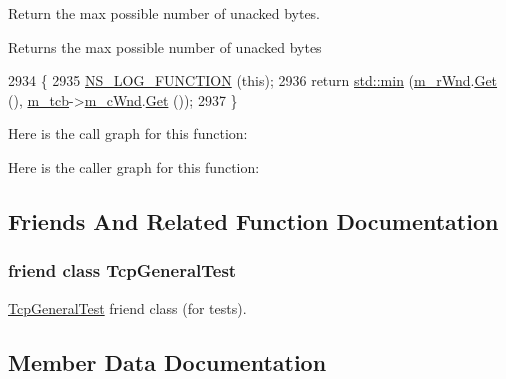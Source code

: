 Return the max possible number of unacked bytes. 

\begin{DoxyReturn}{Returns}
the max possible number of unacked bytes 
\end{DoxyReturn}

\begin{DoxyCode}
2934 \{
2935   \hyperlink{log-macros-disabled_8h_a90b90d5bad1f39cb1b64923ea94c0761}{NS\_LOG\_FUNCTION} (\textcolor{keyword}{this});
2936   \textcolor{keywordflow}{return} \hyperlink{80211b_8c_ac6afabdc09a49a433ee19d8a9486056d}{std::min} (\hyperlink{classns3_1_1TcpSocketBase_af3fafd1671964e0674677be541e1501a}{m\_rWnd}.\hyperlink{classns3_1_1TracedValue_a10fddd1de961ac65acfbeb440a1e8551}{Get} (), \hyperlink{classns3_1_1TcpSocketBase_a26bbaf59001308dc43fb630d76f2e38b}{m\_tcb}->\hyperlink{classns3_1_1TcpSocketState_a7cd3d2156a483c1db436097477a0fd7f}{m\_cWnd}.\hyperlink{classns3_1_1TracedValue_a10fddd1de961ac65acfbeb440a1e8551}{Get} ());
2937 \}
\end{DoxyCode}


Here is the call graph for this function\+:




Here is the caller graph for this function\+:




\subsection{Friends And Related Function Documentation}
\subsubsection[{\texorpdfstring{Tcp\+General\+Test}{TcpGeneralTest}}]{\setlength{\rightskip}{0pt plus 5cm}friend class {\bf Tcp\+General\+Test}\hspace{0.3cm}{\ttfamily [friend]}}\hypertarget{classns3_1_1TcpSocketBase_a9e3da14f8f21e0ea02af26ce426e4804}{}\label{classns3_1_1TcpSocketBase_a9e3da14f8f21e0ea02af26ce426e4804}


\hyperlink{classns3_1_1TcpGeneralTest}{Tcp\+General\+Test} friend class (for tests). 



\subsection{Member Data Documentation}
